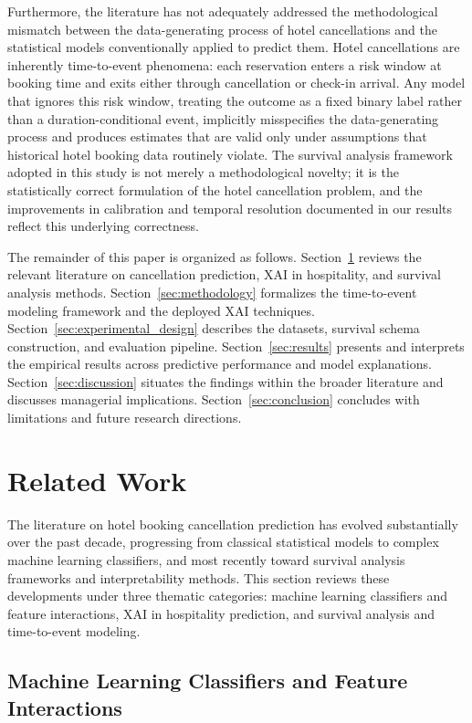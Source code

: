 \documentclass[pdflatex,iicol,sn-mathphys-ay]{sn-jnl}
\theoremstyle{thmstyleone}%
\theoremstyle{thmstyletwo}%
\theoremstyle{thmstylethree}%
\begin{document}
Furthermore, the literature has not adequately addressed the methodological mismatch between the data-generating process of hotel cancellations and the statistical models conventionally applied to predict them. Hotel cancellations are inherently time-to-event phenomena: each reservation enters a risk window at booking time and exits either through cancellation or check-in arrival. Any model that ignores this risk window, treating the outcome as a fixed binary label rather than a duration-conditional event, implicitly misspecifies the data-generating process and produces estimates that are valid only under assumptions that historical hotel booking data routinely violate. The survival analysis framework adopted in this study is not merely a methodological novelty; it is the statistically correct formulation of the hotel cancellation problem, and the improvements in calibration and temporal resolution documented in our results reflect this underlying correctness.

The remainder of this paper is organized as follows. Section~\ref{sec:related_work} reviews the relevant literature on cancellation prediction, XAI in hospitality, and survival analysis methods. Section~\ref{sec:methodology} formalizes the time-to-event modeling framework and the deployed XAI techniques. Section~\ref{sec:experimental_design} describes the datasets, survival schema construction, and evaluation pipeline. Section~\ref{sec:results} presents and interprets the empirical results across predictive performance and model explanations. Section~\ref{sec:discussion} situates the findings within the broader literature and discusses managerial implications. Section~\ref{sec:conclusion} concludes with limitations and future research directions.

\section{Related Work}
\label{sec:related_work}

The literature on hotel booking cancellation prediction has evolved substantially over the past decade, progressing from classical statistical models to complex machine learning classifiers, and most recently toward survival analysis frameworks and interpretability methods. This section reviews these developments under three thematic categories: machine learning classifiers and feature interactions, XAI in hospitality prediction, and survival analysis and time-to-event modeling.

\subsection{Machine Learning Classifiers and Feature Interactions}
\end{document}
